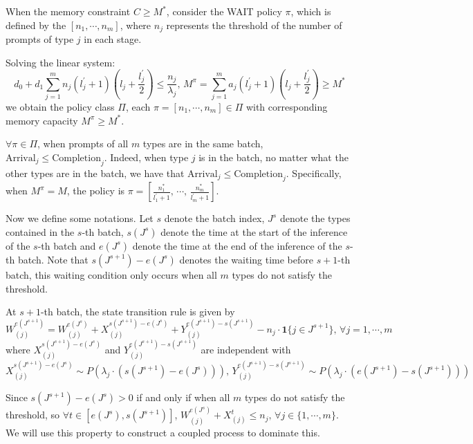 When the memory constraint $C\geq M^*$, consider the WAIT policy $\pi$, which is defined by the $[n_1,\cdots,n_m]$, where $n_j$ represents the threshold of the number of prompts of type $j$ in each stage.

Solving the linear system:
$$d_0+d_1\sum_{j=1}^m n_j(l_j^\prime+1)\left(l_j+\frac{l_j^\prime}{2}\right)\leq \frac{n_j}{\lambda_j},\,M^{\pi} = \sum_{j=1}^ma_j(l_j^\prime+1)\left(l_j+\frac{l_j^\prime}{2}\right)\geq  M^*$$
we obtain the policy class $\Pi$, each $\pi = [n_1,\cdots,n_m]\in \Pi$ with corresponding memory capacity $M^{\pi} \geq  M^*$.

$\forall \pi \in \Pi$, when prompts of all $m$ types are in the same batch, $\text{Arrival}_j\leq \text{Completion}_j$. Indeed, when type $j$ is in the batch, no matter what the other types are in the batch, we have that $\text{Arrival}_j\leq \text{Completion}_j$. Specifically, when $M^\pi = M$, the policy is $\pi = [ \frac{n_1^*}{l_1^\prime+1},\,\cdots,\,\frac{n_m^*}{l_m^\prime+1} ]$. 

Now we define some notations. Let $s$ denote the batch index, $J^s$ denote the types contained in the $s$-th batch, $s(J^s)$ denote the time at the start of the inference of the $s$-th batch and $e(J^s)$ denote the time at the end of the inference of the $s$-th batch. Note that $s(J^{s+1})-e(J^s)$ denotes the waiting time before $s+1$-th batch, this waiting condition only occurs when all $m$ types do not satisfy the threshold.

At $s+1$-th batch, the state transition rule is given by
$$W_{(j)}^{e(J^{s+1})}=W_{(j)}^{e(J^s)}+X_{(j)}^{s(J^{s+1})-e(J^{s})}+Y_{(j)}^{e(J^{s+1})-s(J^{s+1})}- n_j\cdot \mathbf{1}\{j\in J^{s+1}\} ,\,\forall j  = 1,\cdots,m$$
where $X_{(j)}^{s(J^{s+1})-e(J^{s})}$ and $Y_{(j)}^{e(J^{s+1})-s(J^{s+1})}$ are independent with
$$X_{(j)}^{s(J^{s+1})-e(J^{s})} \sim P(\lambda_j \cdot (s(J^{s+1})-e(J^{s}))),\,Y_{(j)}^{e(J^{s+1})-s(J^{s+1})} \sim P(\lambda_j \cdot (e(J^{s+1})-s(J^{s+1})))$$

Since $s(J^{s+1})-e(J^{s})>0$ if and only if  when all $m$ types do not satisfy the threshold, so $\forall t \in [e(J^s), s(J^{s+1})]$, $W_{(j)}^{e(J^s)}+X^t_{(j)}\leq n_j,\, \forall j \in \{1,\cdots,m\}$. We will use this property to construct a coupled process to dominate this. 

